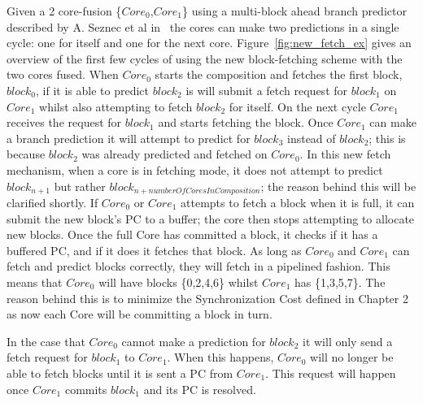 Given a 2 core-fusion \{$Core_0$,$Core_1$\} using a multi-block ahead branch predictor described by A. Seznec et al in~\cite{SeseznecMultipleBlock} the cores can make two predictions in a single cycle: one for itself and one for the next core.
Figure~\ref{fig:new_fetch_ex} gives an overview of the first few cycles of using the new block-fetching scheme with the two cores fused.
When $Core_0$ starts the composition and fetches the first block, $block_0$, if it is able to predict $block_2$ is will submit a fetch request for $block_1$ on $Core_1$ whilst also attempting to fetch $block_2$ for itself.
On the next cycle $Core_1$ receives the request for $block_1$ and starts fetching the block.
Once $Core_1$ can make a branch prediction it will attempt to predict for $block_3$ instead of $block_2$; this is because $block_2$ was already predicted and fetched on $Core_0$.
In this new fetch mechanism, when a core is in fetching mode, it does not attempt to predict $block_{n+1}$ but rather $block_{n+numberOfCoresInComposition}$; the reason behind this will be clarified shortly.
If $Core_0$ or $Core_1$ attempts to fetch a block when it is full, it can submit the new block's PC to a buffer; the core then stops attempting to allocate new blocks.
Once the full Core has committed a block, it checks if it has a buffered PC, and if it does it fetches that block.
As long as $Core_0$ and $Core_1$ can fetch and predict blocks correctly, they will fetch in a pipelined fashion.
This means that $Core_0$ will have blocks \{0,2,4,6\} whilst $Core_1$ has \{1,3,5,7\}.
The reason behind this is to minimize the Synchronization Cost defined in Chapter 2 as now each Core will be committing a block in turn.

In the case that $Core_0$ cannot make a prediction for $block_2$ it will only send a fetch request for $block_1$ to $Core_1$.
When this happens, $Core_0$ will no longer be able to fetch blocks until it is sent a PC from $Core_1$.
This request will happen once $Core_1$ commits $block_1$ and its PC is resolved.
